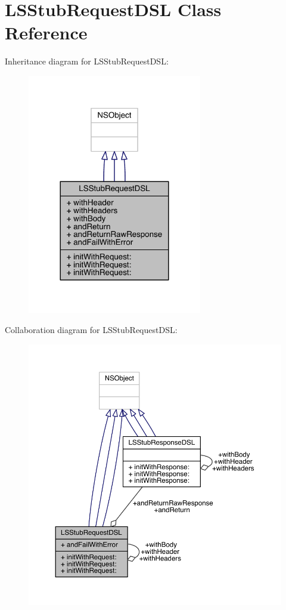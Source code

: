 \hypertarget{interface_l_s_stub_request_d_s_l}{\section{L\-S\-Stub\-Request\-D\-S\-L Class Reference}
\label{interface_l_s_stub_request_d_s_l}
}


Inheritance diagram for L\-S\-Stub\-Request\-D\-S\-L\-:\nopagebreak
\begin{figure}[H]
\begin{center}
\leavevmode
\includegraphics[width=216pt]{interface_l_s_stub_request_d_s_l__inherit__graph}
\end{center}
\end{figure}


Collaboration diagram for L\-S\-Stub\-Request\-D\-S\-L\-:\nopagebreak
\begin{figure}[H]
\begin{center}
\leavevmode
\includegraphics[width=350pt]{interface_l_s_stub_request_d_s_l__coll__graph}
\end{center}
\end{figure}

